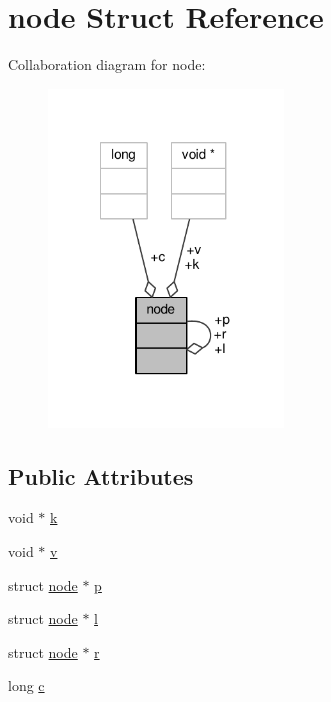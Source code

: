 \hypertarget{structnode}{\section{node Struct Reference}
\label{structnode}
}


Collaboration diagram for node\-:
\nopagebreak
\begin{figure}[H]
\begin{center}
\leavevmode
\includegraphics[width=177pt]{structnode__coll__graph}
\end{center}
\end{figure}
\subsection*{Public Attributes}
\begin{DoxyCompactItemize}
\item 
void $\ast$ \hyperlink{structnode_a06123aeb6587dae270d797c7135bf870}{k}
\item 
void $\ast$ \hyperlink{structnode_aa5d7896b42e0a397179499e031651bfb}{v}
\item 
struct \hyperlink{structnode}{node} $\ast$ \hyperlink{structnode_add6b89fbf83ba5f857eedee86699a515}{p}
\item 
struct \hyperlink{structnode}{node} $\ast$ \hyperlink{structnode_a3c3d6a903c5d1354fbeabc93dc2b71d6}{l}
\item 
struct \hyperlink{structnode}{node} $\ast$ \hyperlink{structnode_a3f9eaef9329fc8fdf57fe684e503d0a9}{r}
\item 
long \hyperlink{structnode_a7742792bd89a935bd9f1122edbb73d69}{c}
\end{DoxyCompactItemize}


